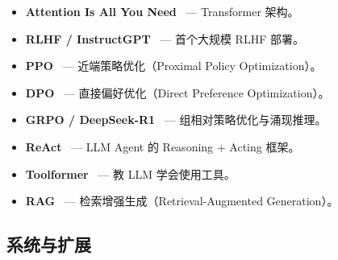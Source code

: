\begin{itemize}
  \item \textbf{Attention Is All You Need}~\cite{vaswani2017attention} --- Transformer 架构。
  \item \textbf{RLHF / InstructGPT}~\cite{ouyang2022training} --- 首个大规模 RLHF 部署。
  \item \textbf{PPO}~\cite{schulman2017proximal} --- 近端策略优化（Proximal Policy Optimization）。
  \item \textbf{DPO}~\cite{rafailov2023direct} --- 直接偏好优化（Direct Preference Optimization）。
  \item \textbf{GRPO / DeepSeek-R1}~\cite{shao2024deepseekmath, deepseek2025r1} --- 组相对策略优化与涌现推理。
  \item \textbf{ReAct}~\cite{yao2023react} --- LLM Agent 的 Reasoning + Acting 框架。
  \item \textbf{Toolformer}~\cite{schick2023toolformer} --- 教 LLM 学会使用工具。
  \item \textbf{RAG}~\cite{lewis2020retrieval} --- 检索增强生成（Retrieval-Augmented Generation）。
\end{itemize}

\subsection{系统与扩展}
\label{systems-and-scaling}

